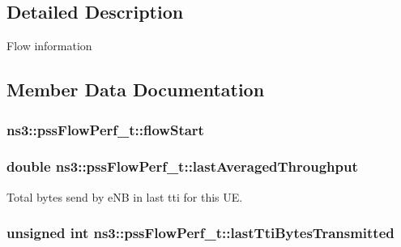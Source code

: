 \subsection{Detailed Description}
Flow information 

\subsection{Member Data Documentation}
\subsubsection[{\texorpdfstring{flow\+Start}{flowStart}}]{ ns3\+::pss\+Flow\+Perf\+\_\+t\+::flow\+Start}\hypertarget{structns3_1_1pssFlowPerf__t_a6b7c218ad4d7f914539e95b02bd0e82f}{}\label{structns3_1_1pssFlowPerf__t_a6b7c218ad4d7f914539e95b02bd0e82f}
\subsubsection[{\texorpdfstring{last\+Averaged\+Throughput}{lastAveragedThroughput}}]{\setlength{\rightskip}{0pt plus 5cm}double ns3\+::pss\+Flow\+Perf\+\_\+t\+::last\+Averaged\+Throughput}\hypertarget{structns3_1_1pssFlowPerf__t_a211e85f8ed4295134904ea6680fbd3aa}{}\label{structns3_1_1pssFlowPerf__t_a211e85f8ed4295134904ea6680fbd3aa}


Total bytes send by e\+NB in last tti for this UE. 

\subsubsection[{\texorpdfstring{last\+Tti\+Bytes\+Transmitted}{lastTtiBytesTransmitted}}]{\setlength{\rightskip}{0pt plus 5cm}unsigned int ns3\+::pss\+Flow\+Perf\+\_\+t\+::last\+Tti\+Bytes\+Transmitted}\hypertarget{structns3_1_1pssFlowPerf__t_ab4797a06f356f6d9b069a62de8534828}{}\label{structns3_1_1pssFlowPerf__t_ab4797a06f356f6d9b069a62de8534828}


